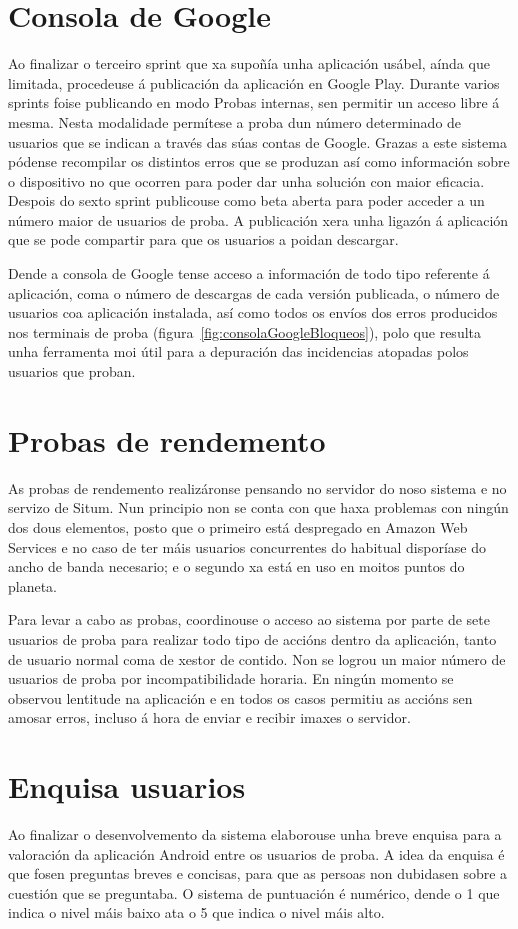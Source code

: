 \section{Consola de Google}
Ao finalizar o terceiro sprint que xa supoñía unha aplicación usábel, aínda que limitada, procedeuse á publicación da aplicación en Google Play. Durante varios sprints foise publicando en modo Probas internas, sen permitir un acceso libre á mesma. Nesta modalidade permítese a proba dun número determinado de usuarios que se indican a través das súas contas de Google. Grazas a este sistema pódense recompilar os distintos erros que se produzan así como información sobre o dispositivo no que ocorren para poder dar unha solución con maior eficacia.
Despois do sexto sprint publicouse como beta aberta para poder acceder a un número maior de usuarios de proba. A publicación xera unha ligazón á aplicación que se pode compartir para que os usuarios a poidan descargar.

Dende a consola de Google tense acceso a información de todo tipo referente á aplicación, coma o número de descargas de cada versión publicada, o número de usuarios coa aplicación instalada, así como todos os envíos dos erros producidos nos terminais de proba (figura~\ref{fig:consolaGoogleBloqueos}), polo que resulta unha ferramenta moi útil para a depuración das incidencias atopadas polos usuarios que proban.


\section{Probas de rendemento}
As probas de rendemento realizáronse pensando no servidor do noso sistema e no servizo de Situm. Nun principio non se conta con que haxa problemas con ningún dos dous elementos, posto que o primeiro está despregado en Amazon Web Services e no caso de ter máis usuarios concurrentes do habitual disporíase do ancho de banda necesario; e o segundo xa está en uso en moitos puntos do planeta.

Para levar a cabo as probas, coordinouse o acceso ao sistema por parte de sete usuarios de proba para realizar todo tipo de accións dentro da aplicación, tanto de usuario normal coma de xestor de contido. Non se logrou un maior número de usuarios de proba por incompatibilidade horaria. En ningún momento se observou lentitude na aplicación e en todos os casos permitiu as accións sen amosar erros, incluso á hora de enviar e recibir imaxes o servidor.


\section{Enquisa usuarios}
Ao finalizar o desenvolvemento da sistema elaborouse unha breve enquisa para a valoración da aplicación Android entre os usuarios de proba. A idea da enquisa é que fosen preguntas breves e concisas, para que as persoas non dubidasen sobre a cuestión que se preguntaba. O sistema de puntuación é numérico, dende o 1 que indica o nivel máis baixo ata o 5 que indica o nivel máis alto.

